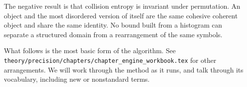 The negative result is that collision entropy is invariant under permutation. An object and the
most disordered version of itself are the same cohesive coherent object and share the same
identity. No bound built from a histogram can separate a structured domain from a rearrangement of
the same symbols.

What follows is the most basic form of the algorithm. See
\texttt{theory/\allowbreak{}precision/\allowbreak{}chapters/\allowbreak{}chapter\_\allowbreak{}engine\_\allowbreak{}workbook.\allowbreak{}tex}
for other arrangements. We will work through the method as it runs, and talk through its
vocabulary, including new or nonstandard terms.
\cleardoublepage
